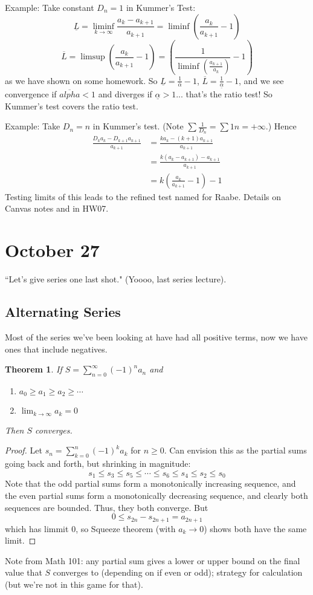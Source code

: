 \documentclass{article}
\theoremstyle{plain}
\newtheorem{theorem}{Theorem}
\theoremstyle{remark}
\begin{document}
Example: Take constant $D_n = 1$ in Kummer's Test:
\[
	\underline{L} = \liminf_{k \to \infty} \frac{a_k - a_{k+1}}{a_{k+1}}
	= \liminf \left(\frac{a_k}{a_{k+1}} - 1\right)
\]
\[
	\overline{L} = \limsup \left(\frac{a_k}{a_{k+1}} - 1\right)
	= \left( \frac{1}{\liminf\left(\frac{a_{k+1}}{a_k}\right)} - 1\right)
\]
as we have shown on some homework.
So $\underline{L} = \frac{1}{\overline{\alpha}} - 1$,
$\overline{L} = \frac{1}{\underline{\alpha}} - 1$,
and we see convergence if $\overline{alpha} < 1$ and diverges if $\underline{\alpha} > 1$...
that's the ratio test!
So Kummer's test covers the ratio test.

Example: Take $D_n = n$ in Kummer's test.
(Note $\sum\frac{1}{D_n} = \sum{1}{n} = +\infty$.)
Hence
\begin{align*}
	\frac{D_ka_k - D_{k+1}a_{k+1}}{a_{k+1}}
	&= \frac{ka_k - (k+1)a_{k+1}}{a_{k+1}}\\
	&= \frac{k(a_k - a_{k+1}) - a_{k+1}}{a_{k+1}}\\
	&= k\left(\frac{a_k}{a_{k+1}} - 1\right) - 1
\end{align*}
Testing limits of this leads to the refined test named for Raabe.
Details on Canvas notes and in HW07.

\section{October 27}
``Let's give series one last shot." (Yoooo, last series lecture).
\subsection{Alternating Series}
Most of the series we've been looking at have had all
positive terms, now we have ones that include negatives.
\begin{theorem}
	If $S = \sum_{n=0}^\infty (-1)^n a_n$ and
	\begin{enumerate}
		\item $a_0 \geq a_1 \geq a_2 \geq \cdots$
		\item $\lim_{k \to \infty} a_k = 0$
	\end{enumerate}
	Then $S$ converges.
\end{theorem}
\begin{proof}
	Let $s_n = \sum_{k=0}^n (-1)^k a_k$ for $n \geq 0$.
	Can envision this as the partial sums going back and forth,
	but shrinking in magnitude:
	\[
		s_1 \leq s_3 \leq s_5 \leq \cdots \leq s_6 \leq s_4 \leq s_2 \leq s_0
	\]
	Note that the odd partial sums form a monotonically increasing sequence,
	and the even partial sums form a monotonically decreasing sequence,
	and clearly both sequences are bounded.
	Thus, they both converge.
	But
	\[
		0 \leq s_{2n} - s_{2n+1} = a_{2n+1}
	\]
	which has limmit $0$,
	so Squeeze theorem (with $a_k \to 0$) shows both have the same limit.
\end{proof}
Note from Math 101:
any partial sum gives a lower or upper bound on the final value
that $S$ converges to (depending on if even or odd);
strategy for calculation (but we're not in this game for that).
\end{document}
